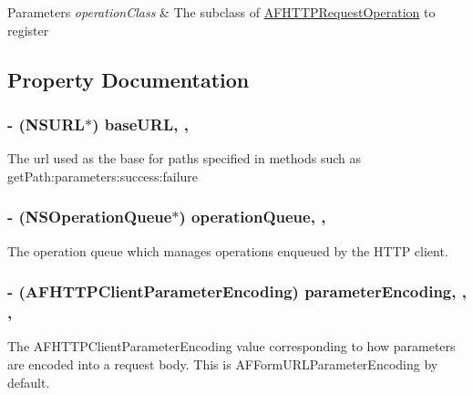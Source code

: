 \begin{DoxyParams}{Parameters}
{\em operation\-Class} & The subclass of {\ttfamily \hyperlink{interface_a_f_h_t_t_p_request_operation}{A\-F\-H\-T\-T\-P\-Request\-Operation}} to register \\
\hline
\end{DoxyParams}


\subsection{Property Documentation}
\hypertarget{interface_a_f_h_t_t_p_client_a10347c37bd9c3d7739edee9cfa0bbd4e}{
\subsubsection[{base\-U\-R\-L}]{\setlength{\rightskip}{0pt plus 5cm}-\/ (N\-S\-U\-R\-L$\ast$) base\-U\-R\-L\hspace{0.3cm}{\ttfamily [read]}, {\ttfamily [nonatomic]}, {\ttfamily [strong]}}}\label{interface_a_f_h_t_t_p_client_a10347c37bd9c3d7739edee9cfa0bbd4e}
The url used as the base for paths specified in methods such as {\ttfamily get\-Path\-:parameters\-:success\-:failure} \hypertarget{interface_a_f_h_t_t_p_client_a95c209c8af8f8b631463be6a4abf3eac}{
\subsubsection[{operation\-Queue}]{\setlength{\rightskip}{0pt plus 5cm}-\/ (N\-S\-Operation\-Queue$\ast$) operation\-Queue\hspace{0.3cm}{\ttfamily [read]}, {\ttfamily [nonatomic]}, {\ttfamily [strong]}}}\label{interface_a_f_h_t_t_p_client_a95c209c8af8f8b631463be6a4abf3eac}
The operation queue which manages operations enqueued by the H\-T\-T\-P client. \hypertarget{interface_a_f_h_t_t_p_client_a696a776a0dce80bf3b848b3599ff8e6c}{
\subsubsection[{parameter\-Encoding}]{\setlength{\rightskip}{0pt plus 5cm}-\/ ({\bf A\-F\-H\-T\-T\-P\-Client\-Parameter\-Encoding}) parameter\-Encoding\hspace{0.3cm}{\ttfamily [read]}, {\ttfamily [write]}, {\ttfamily [nonatomic]}, {\ttfamily [assign]}}}\label{interface_a_f_h_t_t_p_client_a696a776a0dce80bf3b848b3599ff8e6c}
The {\ttfamily A\-F\-H\-T\-T\-P\-Client\-Parameter\-Encoding} value corresponding to how parameters are encoded into a request body. This is {\ttfamily A\-F\-Form\-U\-R\-L\-Parameter\-Encoding} by default.


